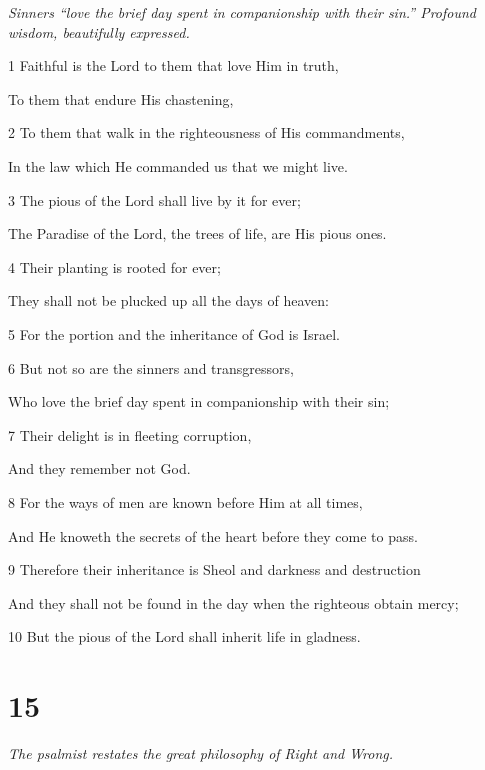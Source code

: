 \par \textit{Sinners “love the brief day spent in companionship with their sin.” Profound wisdom, beautifully expressed.}

\par 1 Faithful is the Lord to them that love Him in truth,
\par  To them that endure His chastening,
\par 2 To them that walk in the righteousness of His commandments,
\par  In the law which He commanded us that we might live.
\par 3 The pious of the Lord shall live by it for ever;
\par  The Paradise of the Lord, the trees of life, are His pious ones.
\par 4 Their planting is rooted for ever;
\par  They shall not be plucked up all the days of heaven:
\par 5 For the portion and the inheritance of God is Israel.
\par 6 But not so are the sinners and transgressors,
\par  Who love the brief day spent in companionship with their sin;
\par 7 Their delight is in fleeting corruption,
\par  And they remember not God.
\par 8 For the ways of men are known before Him at all times,
\par  And He knoweth the secrets of the heart before they come to pass.
\par 9 Therefore their inheritance is Sheol and darkness and destruction
\par  And they shall not be found in the day when the righteous obtain mercy;
\par 10 But the pious of the Lord shall inherit life in gladness.

\chapter{15}

\par \textit{The psalmist restates the great philosophy of Right and Wrong.}

